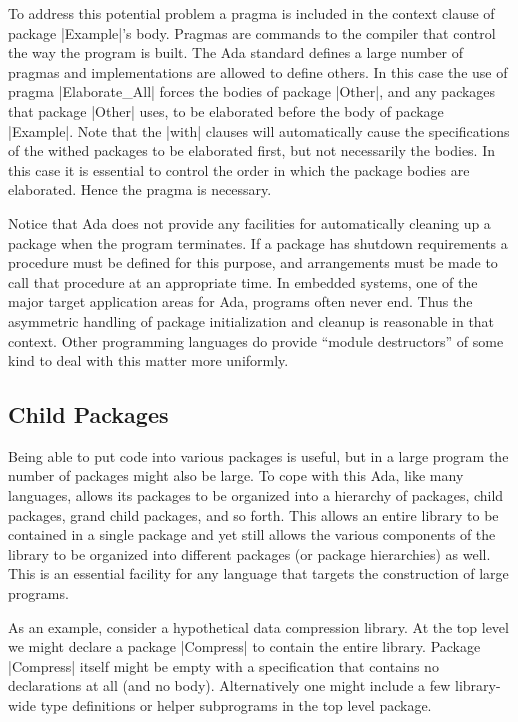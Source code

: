 To address this potential problem a pragma is included in the context clause of package
|Example|'s body. Pragmas are commands to the compiler that control the way the program is
built. The Ada standard defines a large number of pragmas and implementations are allowed to
define others. In this case the use of pragma |Elaborate_All| forces the bodies of package
|Other|, and any packages that package |Other| uses, to be elaborated before the body of package
|Example|. Note that the |with| clauses will automatically cause the specifications of the
withed packages to be elaborated first, but not necessarily the bodies. In this case it is
essential to control the order in which the package bodies are elaborated. Hence the pragma is
necessary.

Notice that Ada does not provide any facilities for automatically cleaning up a package when the
program terminates. If a package has shutdown requirements a procedure must be defined for this
purpose, and arrangements must be made to call that procedure at an appropriate time. In
embedded systems, one of the major target application areas for Ada, programs often never end.
Thus the asymmetric handling of package initialization and cleanup is reasonable in that
context. Other programming languages do provide ``module destructors'' of some kind to deal with
this matter more uniformly.

\subsection{Child Packages}

Being able to put code into various packages is useful, but in a large program the number of
packages might also be large. To cope with this Ada, like many languages, allows its packages to
be organized into a hierarchy of packages, child packages, grand child packages, and so forth.
This allows an entire library to be contained in a single package and yet still allows the
various components of the library to be organized into different packages (or package
hierarchies) as well. This is an essential facility for any language that targets the
construction of large programs.

As an example, consider a hypothetical data compression library. At the top level we might
declare a package |Compress| to contain the entire library. Package |Compress| itself might be
empty with a specification that contains no declarations at all (and no body). Alternatively one
might include a few library-wide type definitions or helper subprograms in the top level
package.

